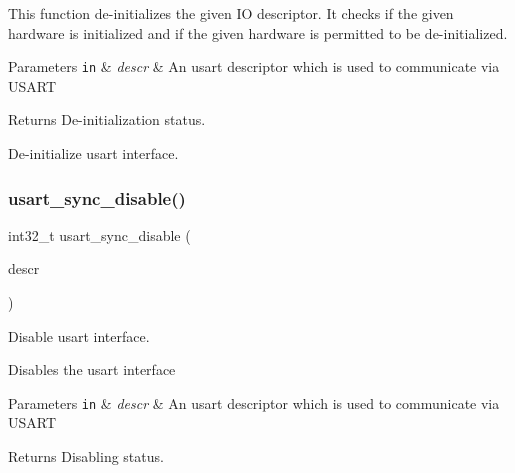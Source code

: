 This function de-\/initializes the given IO descriptor. It checks if the given hardware is initialized and if the given hardware is permitted to be de-\/initialized.


\begin{DoxyParams}[1]{Parameters}
\mbox{\tt in}  & {\em descr} & An usart descriptor which is used to communicate via U\+S\+A\+RT\\
\hline
\end{DoxyParams}
\begin{DoxyReturn}{Returns}
De-\/initialization status.
\end{DoxyReturn}
De-\/initialize usart interface. \mbox{\label{group__doc__driver__hal__usart__sync_ga76abe691b76e4b95b4e3a7d5bc79b026}} 
\subsubsection{\texorpdfstring{usart\+\_\+sync\+\_\+disable()}{usart\_sync\_disable()}}
{\footnotesize\ttfamily int32\+\_\+t usart\+\_\+sync\+\_\+disable (\begin{DoxyParamCaption}\item[{struct \hyperlink{structusart__sync__descriptor}{usart\+\_\+sync\+\_\+descriptor} $\ast$const}]{descr }\end{DoxyParamCaption})}



Disable usart interface. 

Disables the usart interface


\begin{DoxyParams}[1]{Parameters}
\mbox{\tt in}  & {\em descr} & An usart descriptor which is used to communicate via U\+S\+A\+RT\\
\hline
\end{DoxyParams}
\begin{DoxyReturn}{Returns}
Disabling status. 
\end{DoxyReturn}
\mbox{\label{group__doc__driver__hal__usart__sync_ga351aa9c8c94b4e8b0eb5efb1ecd74a82}} 
